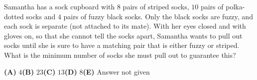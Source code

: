 Samantha has a sock cupboard with $8$ pairs of striped socks, $10$ pairs of polka-dotted socks and $4$ pairs of fuzzy black socks. Only the black socks are fuzzy, and each sock is separate (not attached to its mate). With her eyes closed and with gloves on, so that she cannot tell the socks apart, Samantha wants to pull out socks until she is sure to have a matching pair that is either fuzzy or striped. What is the minimum number of socks she must pull out to guarantee this?

\textbf{(A)} $4$\qquad\textbf{(B)} $23$\qquad\textbf{(C)} $13$\qquad\textbf{(D)} $8$\qquad\textbf{(E)} Answer not given
